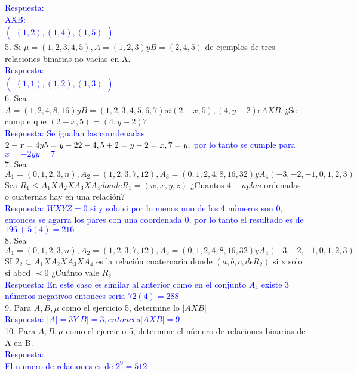 \documentclass{article}
\begin{document}
\textcolor{blue}{Respuesta:\\AXB:\\
$
\left(\begin{smallmatrix}
(1,2),(1,4),(1,5)
\end{smallmatrix}\right)
$
}\\
5. Si $\mu = (1,2,3,4,5) , A=(1,2,3) y B=(2,4,5)$ de ejemplos de tres relaciones binarias no vacías en A.\\
\textcolor{blue}{Respuesta:\\
$
\left(\begin{smallmatrix}
(1,1),(1,2),(1,3)
\end{smallmatrix}\right)
$
}\\
6. Sea $A=(1,2,4,8,16) y B=(1,2,3,4,5,6,7) si (2-x,5),(4,y-2) \epsilon AXB,$¿Se cumple que $(2-x,5)=(4,y-2)$?\\
\textcolor{blue}{Respuesta: Se igualan las coordenadas\\$2-x=4 y 5=y-2\\2-4 , 5+2=y\\-2=x , 7=y;$ por lo tanto se cumple para $x=-2 y y=7$
}\\
7. Sea $A_1=(0,1,2,3,n),A_2=(1,2,3,7,12),A_3=(0,1,2,4,8,16,32) y A_4(-3,-2,-1,0,1,2,3)$\\Sea $R_1 \leq A_1 X A_2 X A_3 X A_4 donde R_1=(w,x,y,z)$ ¿Cuantos $4-uplas$ ordenadas o cuaternas hay en una relación?\\
\textcolor{blue}{Respuesta: $WXYZ= 0$ si y solo si por lo menos uno de los 4 números son 0, entonces se agarra los pares con una coordenada 0, por lo tanto el resultado es de $196+5(4)=216$
}\\
8. Sea $A_1=(0,1,2,3,n),A_2=(1,2,3,7,12),A_3=(0,1,2,4,8,16,32) y A_4(-3,-2,-1,0,1,2,3)$\\SI $2_2 \subset A_1 X A_2 X A_3 X A_4$ es la relación cuaternaria donde $(a,b,c,d \epsilon R_2)$ si x solo si abcd $\prec 0$ ¿Cuánto vale $R_2$\\
\textcolor{blue}{Respuesta: En este caso es similar al anterior como en el conjunto $A_4$ existe 3 números negativos entonces seria $72(4)=288$
}\\
9. Para $A,B, \mu$ como el ejercicio 5, determine lo $|AXB|$\\
\textcolor{blue}{Respuesta: $|A|=3 Y |B|=3, entonces |AXB|=9$
}\\
10. Para $A,B, \mu$ como el ejercicio 5, determine el número de relaciones binarias de A en B.\\
\textcolor{blue}{Respuesta:\\
El numero de relaciones es de $2^9=512$
}
\end{document}
